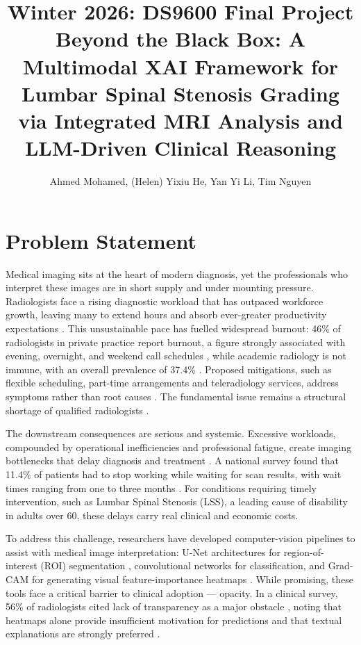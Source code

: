 \documentclass[12pt]{article}
\title{Winter 2026: DS9600 Final Project \\ \textbf {Beyond the Black Box: A Multimodal XAI Framework for Lumbar Spinal Stenosis Grading via Integrated MRI Analysis and LLM-Driven Clinical Reasoning}}
\author{Ahmed Mohamed, (Helen) Yixiu He, Yan Yi Li, Tim Nguyen}
\date{}
\begin{document}
\maketitle
\section{Problem Statement}
\label{problem_statement}
Medical imaging sits at the heart of modern diagnosis, yet the professionals who interpret these images are in short supply and under mounting pressure. Radiologists face a rising diagnostic workload that has outpaced workforce growth, leaving many to extend hours and absorb ever-greater productivity expectations \citep{Jing2025}. This unsustainable pace has fuelled widespread burnout: 46\% of radiologists in private practice report burnout, a figure strongly associated with evening, overnight, and weekend call schedules \citep{Parikh2023}, while academic radiology is not immune, with an overall prevalence of 37.4\% \citep{Higgins2021}. Proposed mitigations, such as flexible scheduling, part-time arrangements and teleradiology services, address symptoms rather than root causes \citep{Rawson2024}. The fundamental issue remains a structural shortage of qualified radiologists \citep{Jing2025}.

The downstream consequences are serious and systemic. Excessive workloads, compounded by operational inefficiencies and professional fatigue, create imaging bottlenecks that delay diagnosis and treatment \citep{Cournane2016}. A \citeyear{nanos} national survey found that 11.4\% of patients had to stop working while waiting for scan results, with wait times ranging from one to three months \citep{nanos}. For conditions requiring timely intervention, such as Lumbar Spinal Stenosis (LSS), a leading cause of disability in adults over 60, these delays carry real clinical and economic costs.

To address this challenge, researchers have developed computer-vision pipelines to assist with medical image interpretation: U-Net architectures for region-of-interest (ROI) segmentation \citep{Silveira2025}, convolutional networks for classification, and Grad-CAM for generating visual feature-importance heatmaps \citep{Selvaraju2019}. While promising, these tools face a critical barrier to clinical adoption — opacity. In a clinical survey, 56\% of radiologists cited lack of transparency as a major obstacle \citep{aravazhi2024}, noting that heatmaps alone provide insufficient motivation for predictions and that textual explanations are strongly preferred \citep{gale2018producingradiologistqualityreportsinterpretable, kayser2024fooloncecontrastingtextual}.
\end{document}
